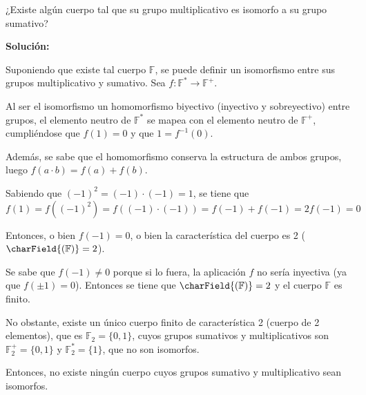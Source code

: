 \documentclass[../../main.tex]{subfiles}
\begin{document}
  \begin{shaded}
    ¿Existe algún cuerpo tal que su grupo multiplicativo es isomorfo a su grupo sumativo?
  \end{shaded}

  \textbf{Solución:}

  Suponiendo que existe tal cuerpo $\mathbb{F}$, se puede definir un isomorfismo entre sus grupos multiplicativo y sumativo. Sea $f: \mathbb{F}^* \to \mathbb{F}^+$.

  Al ser el isomorfismo un homomorfismo biyectivo (inyectivo y sobreyectivo) entre grupos, el elemento neutro de $\mathbb{F}^*$ se mapea con el elemento neutro de $\mathbb{F}^+$, cumpliéndose que $f(1) = 0$ y que $1 = f^{-1}(0)$.

  Además, se sabe que el homomorfismo conserva la estructura de ambos grupos, luego $f(a \cdot b) = f(a) + f(b)$.

  Sabiendo que $(-1)^2 = (-1) \cdot (-1) = 1$, se tiene que
  $$
  f(1) = f((-1)^2) = f((-1) \cdot (-1)) = f(-1) + f(-1) = 2 f(-1) = 0
  $$

  Entonces, o bien $f(-1) = 0$, o bien la característica del cuerpo es 2 ($\charField{(\mathbb{F})} = 2$).

  Se sabe que $f(-1) \ne 0$ porque si lo fuera, la aplicación $f$ no sería inyectiva (ya que $f(\pm 1) = 0$). Entonces se tiene que $\charField{(\mathbb{F})} = 2$ y el cuerpo $\mathbb{F}$ es finito.

  No obstante, existe un único cuerpo finito de característica 2 (cuerpo de 2 elementos), que es $\mathbb{F}_2 = \{ 0, 1 \}$, cuyos grupos sumativos y multiplicativos son $\mathbb{F}^+_2 = \{ 0, 1 \}$ y $\mathbb{F}^*_2 = \{ 1 \}$, que no son isomorfos.

  Entonces, no existe ningún cuerpo cuyos grupos sumativo y multiplicativo sean isomorfos.
\end{document}
